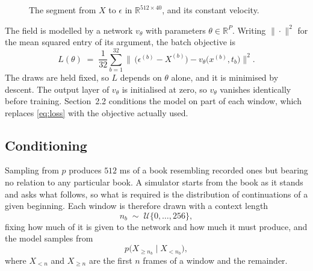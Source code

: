 \documentclass[10pt,a4paper]{article}
\begin{document}
\begin{figure}[H]
\centering
{}
\caption{The segment from $X$ to $\epsilon$ in $\mathbb{R}^{512\times 40}$, and its constant velocity.}
\label{fig:vector}
\end{figure}

The field is modelled by a network $v_\theta$ with parameters
$\theta\in\mathbb{R}^{P}$. Writing $\|\cdot\|^2$ for the mean squared entry of
its argument, the batch objective is
%
\begin{equation}
L(\theta) \;=\; \frac{1}{32}\sum_{b=1}^{32}
\bigl\|\,\bigl(\epsilon^{(b)}-X^{(b)}\bigr)
- v_\theta\bigl(x^{(b)},t_b\bigr)\bigr\|^2 .
\label{eq:loss}
\end{equation}
%
The draws are held fixed, so $L$ depends on $\theta$ alone, and it is minimised
by descent. The output layer of $v_\theta$ is initialised at zero, so
$v_\theta$ vanishes identically before training. Section~2.2 conditions the
model on part of each window, which replaces \eqref{eq:loss} with the objective
actually used.


\subsection{Conditioning}

Sampling from $p$ produces $512$ ms of a book resembling recorded ones but
bearing no relation to any particular book.
A simulator starts from the book as it stands and asks what follows, so what is
required is the distribution of continuations of a given beginning. Each window
is therefore drawn with a context length
%
\begin{equation}
n_b \;\sim\; \mathcal{U}\{0,\ldots,256\},
\label{eq:ctx}
\end{equation}
%
fixing how much of it is given to the network and how much it must produce, and
the model samples from
%
\begin{equation}
p\bigl(X_{\ge n_b} \mid X_{< n_b}\bigr),
\label{eq:conddist}
\end{equation}
%
where $X_{<n}$ and $X_{\ge n}$ are the first $n$ frames of a window and the
remainder.
\end{document}

